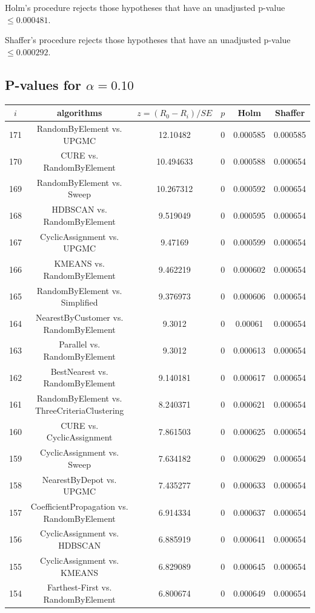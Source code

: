 \documentclass[a4paper,10pt]{article}
\begin{document}
\begin{landscape}
Holm's procedure rejects those hypotheses that have an unadjusted p-value $\le0.000481$.

Shaffer's procedure rejects those hypotheses that have an unadjusted p-value $\le0.000292$.

\pagebreak

\subsection{P-values for $\alpha=0.10$}

\begin{table}[!htp]
\centering\scriptsize
\begin{tabular}{cccccc}
$i$&algorithms&$z=(R_0 - R_i)/SE$&$p$&Holm&Shaffer\\
\hline171&RandomByElement vs. UPGMC&12.10482&0&0.000585&0.000585\\
170&CURE vs. RandomByElement&10.494633&0&0.000588&0.000654\\
169&RandomByElement vs. Sweep&10.267312&0&0.000592&0.000654\\
168&HDBSCAN vs. RandomByElement&9.519049&0&0.000595&0.000654\\
167&CyclicAssignment vs. UPGMC&9.47169&0&0.000599&0.000654\\
166&KMEANS vs. RandomByElement&9.462219&0&0.000602&0.000654\\
165&RandomByElement vs. Simplified&9.376973&0&0.000606&0.000654\\
164&NearestByCustomer vs. RandomByElement&9.3012&0&0.00061&0.000654\\
163&Parallel vs. RandomByElement&9.3012&0&0.000613&0.000654\\
162&BestNearest vs. RandomByElement&9.140181&0&0.000617&0.000654\\
161&RandomByElement vs. ThreeCriteriaClustering&8.240371&0&0.000621&0.000654\\
160&CURE vs. CyclicAssignment&7.861503&0&0.000625&0.000654\\
159&CyclicAssignment vs. Sweep&7.634182&0&0.000629&0.000654\\
158&NearestByDepot vs. UPGMC&7.435277&0&0.000633&0.000654\\
157&CoefficientPropagation vs. RandomByElement&6.914334&0&0.000637&0.000654\\
156&CyclicAssignment vs. HDBSCAN&6.885919&0&0.000641&0.000654\\
155&CyclicAssignment vs. KMEANS&6.829089&0&0.000645&0.000654\\
154&Farthest-First vs. RandomByElement&6.800674&0&0.000649&0.000654\\

\end{tabular}
\end{table}
\end{landscape}
\end{document}
